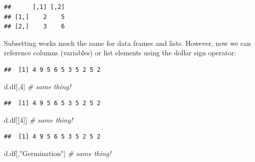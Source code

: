 \documentclass[]{article}
\newenvironment{Shaded}{\begin{snugshade}}{\end{snugshade}}
\newcommand{\DecValTok}[1]{\textcolor[rgb]{0.00,0.00,0.81}{#1}}
\newcommand{\StringTok}[1]{\textcolor[rgb]{0.31,0.60,0.02}{#1}}
\newcommand{\CommentTok}[1]{\textcolor[rgb]{0.56,0.35,0.01}{\textit{#1}}}
\newcommand{\OperatorTok}[1]{\textcolor[rgb]{0.81,0.36,0.00}{\textbf{#1}}}
\newcommand{\NormalTok}[1]{#1}
\begin{document}
\begin{verbatim}
##      [,1] [,2]
## [1,]    2    5
## [2,]    3    6
\end{verbatim}

Subsetting works much the same for data frames and lists. However, now
we can reference columns (variables) or list elements using the dollar
sign operator:

\begin{Shaded}
\end{Shaded}

\begin{verbatim}
##  [1] 4 9 5 6 5 3 5 2 5 2
\end{verbatim}

\begin{Shaded}
\begin{Highlighting}[]
\NormalTok{d.df[,}\DecValTok{4}\NormalTok{]              }\CommentTok{# same thing!}
\end{Highlighting}
\end{Shaded}

\begin{verbatim}
##  [1] 4 9 5 6 5 3 5 2 5 2
\end{verbatim}

\begin{Shaded}
\begin{Highlighting}[]
\NormalTok{d.df[[}\DecValTok{4}\NormalTok{]]             }\CommentTok{# same thing!}
\end{Highlighting}
\end{Shaded}

\begin{verbatim}
##  [1] 4 9 5 6 5 3 5 2 5 2
\end{verbatim}

\begin{Shaded}
\begin{Highlighting}[]
\NormalTok{d.df[,}\StringTok{"Germination"}\NormalTok{]           }\CommentTok{# same thing!}
\end{Highlighting}
\end{Shaded}
\end{document}
